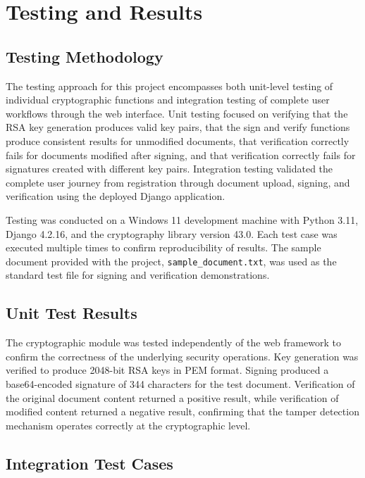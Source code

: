 \chapter{Testing and Results}

\section{Testing Methodology}

The testing approach for this project encompasses both unit-level testing of individual cryptographic functions and integration testing of complete user workflows through the web interface. Unit testing focused on verifying that the RSA key generation produces valid key pairs, that the sign and verify functions produce consistent results for unmodified documents, that verification correctly fails for documents modified after signing, and that verification correctly fails for signatures created with different key pairs. Integration testing validated the complete user journey from registration through document upload, signing, and verification using the deployed Django application.

Testing was conducted on a Windows 11 development machine with Python 3.11, Django 4.2.16, and the cryptography library version 43.0. Each test case was executed multiple times to confirm reproducibility of results. The sample document provided with the project, \texttt{sample\_document.txt}, was used as the standard test file for signing and verification demonstrations.

\section{Unit Test Results}

The cryptographic module was tested independently of the web framework to confirm the correctness of the underlying security operations. Key generation was verified to produce 2048-bit RSA keys in PEM format. Signing produced a base64-encoded signature of 344 characters for the test document. Verification of the original document content returned a positive result, while verification of modified content returned a negative result, confirming that the tamper detection mechanism operates correctly at the cryptographic level.

\section{Integration Test Cases}

